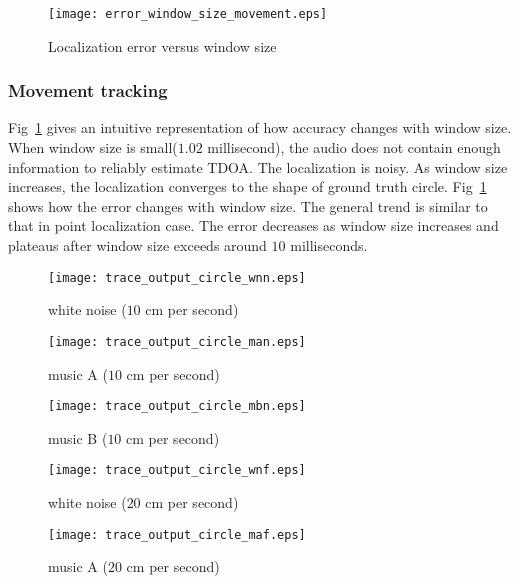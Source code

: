 \begin{figure}[]
\texttt{[image: error\_window\_size\_movement.eps]}
\caption{Localization error versus window size}
\label{fig:err_win_circle}
\end{figure}

\subsubsection{Movement tracking}

Fig~\ref{fig:err_win_circle} gives an intuitive representation of how accuracy changes with window size. When window size is small($1.02$ millisecond), the audio does not contain enough information to reliably estimate TDOA. The localization is noisy. As window size increases, the localization converges to the shape of ground truth circle. Fig~\ref{fig:err_win_circle} shows how the error changes with window size. The general trend is similar to that in point localization case. The error decreases as window size increases and plateaus after window size exceeds around $10$ milliseconds.

\begin{figure*}[]
\centering
\texttt{[image: trace\_output\_circle\_wnn.eps]}
\caption{white noise ($10$ cm per second)}
\label{fig:circle_wnn}
\end{figure*}

\begin{figure*}[]
\centering
\texttt{[image: trace\_output\_circle\_man.eps]}
\caption{music A ($10$ cm per second)}
\label{fig:circle_musican}
\end{figure*}

\begin{figure*}[]
\centering
\texttt{[image: trace\_output\_circle\_mbn.eps]}
\caption{music B ($10$ cm per second)}
\label{fig:circle_musicbn}
\end{figure*}

\begin{figure*}[]
\centering
\texttt{[image: trace\_output\_circle\_wnf.eps]}
\caption{white noise ($20$ cm per second)}
\label{fig:circle_wnf}
\end{figure*}

\begin{figure*}[]
\centering
  \texttt{[image: trace\_output\_circle\_maf.eps]}
  \caption{music A ($20$ cm per second)}
  \label{fig:circle_musicaf}
\end{figure*}

